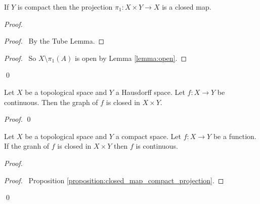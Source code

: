 \begin{proposition}
    \label{proposition:closed_map_compact_projection}
    If $Y$ is compact then the projection $\pi_1 : X \times Y \rightarrow X$
    is a closed map.
\end{proposition}

\begin{proof}
    \pf
    \begin{proof}
        \pf\ By the Tube Lemma.
    \end{proof}
    \qedstep
    \begin{proof}
        \pf\ So $X \setminus \pi_1(A)$ is open by Lemma \ref{lemma:open}.
    \end{proof}
    \qed
\end{proof}

\begin{proposition}
    \label{proposition:graph_closed}
    Let $X$ be a topological space and $Y$ a Hausdorff space.
    Let $f : X \rightarrow Y$ be continuous. Then the graph of $f$
    is closed in $X \times Y$.
\end{proposition}

\begin{proof}
    \qed
\end{proof}

\begin{theorem}
    Let $X$ be a topological space and $Y$ a compact space. Let $f : X \rightarrow Y$ be a function. 
    If the granh of $f$ is closed in $X \times Y$ then $f$ is continuous.
\end{theorem}

\begin{proof}
    \pf
        \begin{proof}
            \pf\ Proposition \ref{proposition:closed_map_compact_projection}.
        \end{proof}
    \qed
\end{proof}


